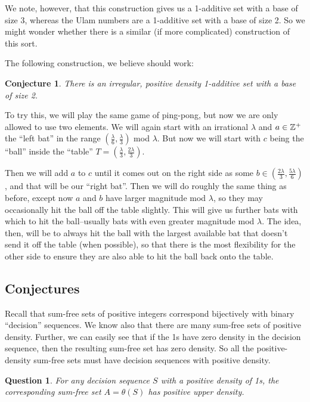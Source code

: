 \documentclass{report}
\newtheorem{conjecture}[theorem]{Conjecture}
\newtheorem{question}[theorem]{Question}
\theoremstyle{remark}
\numberwithin{equation}{section}
\begin{document}
We note, however, that this construction gives us a 1-additive set
with a base of size 3, whereas the Ulam numbers are a 1-additive set
with a base of size 2.  So we might wonder whether there is a similar
(if more complicated) construction of this sort.

The following construction, we believe should work: 

\begin{conjecture}
  There is an irregular, positive density 1-additive set with a base
  of size 2.
\end{conjecture}

To try this, we will play the same game of ping-pong, but now we are
only allowed to use two elements.  We will again start with an
irrational $\lambda$ and $a \in \mathbb{Z}^+$ the ``left bat'' in the range
$(\frac{\lambda}{6}, \frac{\lambda}{3})$ mod $\lambda$.  But now we
will start with $c$ being the ``ball'' inside the ``table''
$T = (\frac{\lambda}{3}, \frac{2\lambda}{3})$.

Then we will add $a$ to $c$ until it comes out on the right side as
some $b \in (\frac{2\lambda}{3}, \frac{5\lambda}{6})$, and that will
be our ``right bat''.  Then we will do roughly the same thing as
before, except now $a$ and $b$ have larger magnitude mod $\lambda$, so
they may occasionally hit the ball off the table slightly.  This will
give us further bats with which to hit the ball--usually bats with
even greater magnitude mod $\lambda$.  The idea, then, will be to
always hit the ball with the largest available bat that doesn't send
it off the table (when possible), so that there is the most
flexibility for the other side to ensure they are also able to hit the
ball back onto the table.

\subsection{Conjectures}

Recall that sum-free sets of positive integers correspond bijectively
with binary ``decision'' sequences.  We know also that there are many
sum-free sets of positive density.  Further, we can easily see that if
the 1s have zero density in the decision sequence, then the resulting
sum-free set has zero density.  So all the positive-density sum-free
sets must have decision sequences with positive density.  

\begin{question}
  For any decision sequence $S$ with a positive density of 1s, the
  corresponding sum-free set $A = \theta(S)$ has positive upper density.
\end{question}
\end{document}
